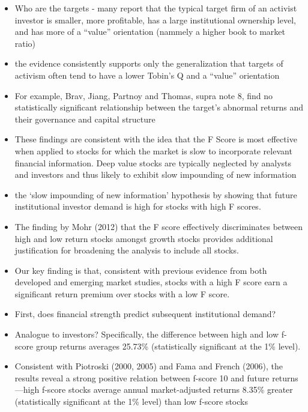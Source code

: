 \documentclass[12pt]{article}
\begin{document}
    \begin{itemize}
        \item Who are the targets - many report that the typical target firm of an activist investor is smaller, more profitable, has a large institutional ownership level, and has more of a “value” orientation (nammely a higher book to market ratio) \citep{CoffeeJr.2014}
        \item the evidence consistently supports only the generalization that targets of activism often tend to have a lower Tobin’s Q and a “value” orientation \citep{CoffeeJr.2014}
        \item For example, Brav, Jiang, Partnoy and Thomas, supra note 8, find no statistically significant relationship between the target’s abnormal returns and their governance and capital structure \citep{CoffeeJr.2014}
        \item These findings are consistent with the idea that the F Score is most effective when applied to stocks for which the market is slow to incorporate relevant financial information. Deep value stocks are typically neglected by analysts and investors and thus likely to exhibit slow impounding of new information \citep{Hyde2014}
        \item the ‘slow impounding of new information’ hypothesis by showing that future institutional investor demand is high for stocks with high F scores. \citep{Hyde2014}
        \item The finding by Mohr (2012) that the F score effectively discriminates between high and low return stocks amongst growth stocks provides additional justification for broadening the analysis to include all stocks. \citep{Hyde2014}
        \item Our key finding is that, consistent with previous evidence from both developed and emerging market studies, stocks with a high F score earn a significant return premium over stocks with a low F score.\citep{Hyde2014}
        \item First, does financial strength predict subsequent institutional demand? \citep{Choi2012}
        \item Analogue to investors? Specifically, the difference between high and low f-score group returns averages 25.73\% (statistically significant at the 1\% level). \citep{Choi2012}
        \item Consistent with Piotroski (2000, 2005) and Fama and French (2006), the results reveal a strong positive relation between f-score 10 and future returns—high f-score stocks average annual market-adjusted returns 8.35\% greater (statistically significant at the 1\% level) than low f-score stocks \citep{Choi2012} 

    \end{itemize}
\end{document}
